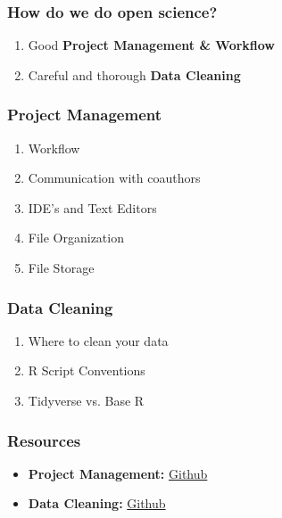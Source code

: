 \documentclass{beamer}
\begin{document}
	\begin{frame}
		\frametitle{How do we do open science?}
		\begin{enumerate}
			\item Good \textbf{Project Management \& Workflow}
			\item Careful and thorough \textbf{Data Cleaning}
		\end{enumerate}
	\end{frame}
	\begin{frame}
		\frametitle{Project Management}
		\begin{enumerate}
			\item Workflow
			\item Communication with coauthors
			\item IDE's and Text Editors
			\item File Organization
			\item File Storage
		\end{enumerate}
	\end{frame}
	\begin{frame}
		\frametitle{Data Cleaning}
		\begin{enumerate}
			\item Where to clean your data
			\item R Script Conventions
			\item Tidyverse vs. Base R
		\end{enumerate}
	\end{frame}
	\begin{frame}
		\frametitle{Resources}
		\begin{itemize}
			\item \textbf{Project Management:} \href{https://github.com/DamonCharlesRoberts/Workshops/tree/main/project_management_data_cleaning/project_management}{Github}
			\item \textbf{Data Cleaning:}
			 \href{https://github.com/DamonCharlesRoberts/Workshops/tree/main/project_management_data_cleaning/data_cleaning}{Github}
		\end{itemize}	
	\end{frame}
\end{document}

